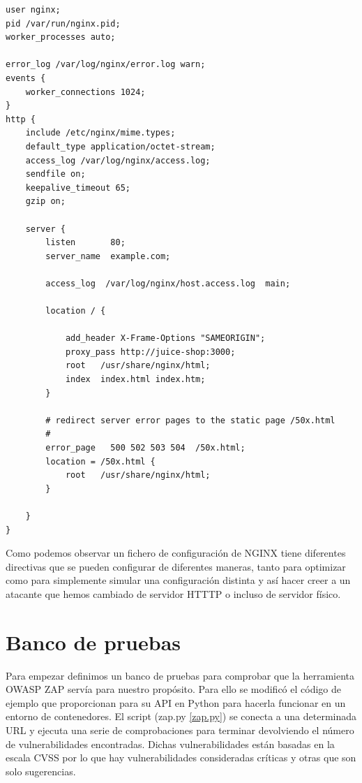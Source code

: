 \begin{lstlisting}[label={lst:nginx_config},caption={Ejemplo de fichero de configuración de NGINX}]
user nginx;
pid /var/run/nginx.pid;
worker_processes auto;

error_log /var/log/nginx/error.log warn;
events {
    worker_connections 1024;
}
http {
    include /etc/nginx/mime.types;
    default_type application/octet-stream;
    access_log /var/log/nginx/access.log;
    sendfile on;
    keepalive_timeout 65;
    gzip on;

    server {
        listen       80;
        server_name  example.com;

        access_log  /var/log/nginx/host.access.log  main;

        location / {

            add_header X-Frame-Options "SAMEORIGIN";
            proxy_pass http://juice-shop:3000;
            root   /usr/share/nginx/html;
            index  index.html index.htm;
        }

        # redirect server error pages to the static page /50x.html
        #
        error_page   500 502 503 504  /50x.html;
        location = /50x.html {
            root   /usr/share/nginx/html;
        }

    }
}
\end{lstlisting}

Como podemos observar un fichero de configuración de NGINX tiene diferentes directivas que se pueden configurar de diferentes maneras, tanto para optimizar como para simplemente simular una configuración distinta y así hacer creer a un atacante que hemos cambiado de servidor HTTTP o incluso de servidor físico.

\section{Banco de pruebas}

Para empezar definimos un banco de pruebas para comprobar que la herramienta OWASP ZAP servía para nuestro propósito. Para ello se modificó el código de ejemplo que proporcionan para su API en Python para hacerla funcionar en un entorno de contenedores. El script (zap.py \ref{zap.py}) se conecta a una determinada URL y ejecuta una serie de comprobaciones para terminar devolviendo el número de vulnerabilidades encontradas. Dichas vulnerabilidades están basadas en la escala CVSS por lo que hay vulnerabilidades consideradas críticas y otras que son solo sugerencias.

